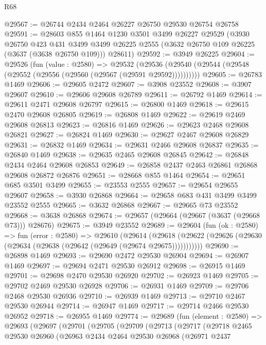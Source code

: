 \begin{lexlean}{R68}
\begin{coremodule}
@29567 := @26744 @2434 @2464 @26227 @26750 @29530 @26754 @26758
@29591 := @28603
    @855
    @1464
    @1230
    @3501
    @3499
    @26227
    @29529
    (@3930
      @26750
      @423
      @431
      @3499
      @3499
      @26225
      @2555
      (@3632 @26750 @109 @26225 (@3637 (@3638 @26750 @109)))
      @28611)
@29592 := @3949 @26225
@29604 := @29526
    (fun (value : @2580) =>
    @29532 (@29536 (@29540 (@29544 (@29548 (@29552 (@29556 (@29560 (@29567 (@29591 @29592))))))))))
@29605 := @26783 @1469
@29606 := @29605 @2472
@29607 := @3908 @23552
@29608 := @3907 @29607
@29610 := @29606 @29608 @26789
@29611 := @26792 @1469
@29614 := @29611 @2471 @29608 @26797
@29615 := @26800 @1469
@29618 := @29615 @2470 @29608 @26805
@29619 := @26808 @1469
@29622 := @29619 @2469 @29608 @26813
@29623 := @26816 @1469
@29626 := @29623 @2468 @29608 @26821
@29627 := @26824 @1469
@29630 := @29627 @2467 @29608 @26829
@29631 := @26832 @1469
@29634 := @29631 @2466 @29608 @26837
@29635 := @26840 @1469
@29638 := @29635 @2465 @29608 @26845
@29642 := @26848 @2434 @2464 @29608 @26853
@29649 := @26858 @2437 @2463 @26861 @26868 @29608 @26872 @26876
@29651 := @28668 @855 @1464
@29654 := @29651 @685 @3501 @3499
@29655 := @23553 @2555
@29657 := @29654 @29655 @29607
@29658 := @3930 @26868
@29664 := @29658 @683 @431 @3499 @3499 @23552 @2555
@29665 := @3632 @26868
@29667 := @29665 @73 @23552
@29668 := @3638 @26868
@29674 := @29657 (@29664 (@29667 (@3637 (@29668 @73))) @28676)
@29675 := @3949 @23552
@29689 := @29604
    (fun (ok : @2580) =>
    fun (error : @2580) =>
    @29610
      (@29614
        (@29618 (@29622 (@29626 (@29630 (@29634 (@29638 (@29642 (@29649 (@29674 @29675)))))))))))
@29690 := @26898 @1469
@29693 := @29690 @2472 @29530 @26904
@29694 := @26907 @1469
@29697 := @29694 @2471 @29530 @26912
@29698 := @26915 @1469
@29701 := @29698 @2470 @29530 @26920
@29702 := @26923 @1469
@29705 := @29702 @2469 @29530 @26928
@29706 := @26931 @1469
@29709 := @29706 @2468 @29530 @26936
@29710 := @26939 @1469
@29713 := @29710 @2467 @29530 @26944
@29714 := @26947 @1469
@29717 := @29714 @2466 @29530 @26952
@29718 := @26955 @1469
@29774 := @29689
    (fun (element : @2580) =>
    @29693
      (@29697
        (@29701
          (@29705
            (@29709
              (@29713
                (@29717
                  (@29718
                    @2465
                    @29530
                    @26960
                    (@26963
                      @2434
                      @2464
                      @29530
                      @26968
                      (@26971
                        @2437

\end{coremodule}
\end{lexlean}
